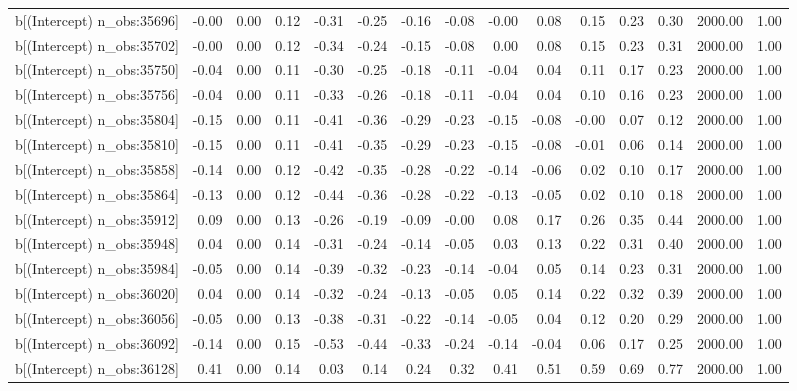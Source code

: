 \begin{table}[ht]
\begin{tabular}{rrrrrrrrrrrrrrr}
  b[(Intercept) n\_obs:35696] & -0.00 & 0.00 & 0.12 & -0.31 & -0.25 & -0.16 & -0.08 & -0.00 & 0.08 & 0.15 & 0.23 & 0.30 & 2000.00 & 1.00 \\ 
  b[(Intercept) n\_obs:35702] & -0.00 & 0.00 & 0.12 & -0.34 & -0.24 & -0.15 & -0.08 & 0.00 & 0.08 & 0.15 & 0.23 & 0.31 & 2000.00 & 1.00 \\ 
  b[(Intercept) n\_obs:35750] & -0.04 & 0.00 & 0.11 & -0.30 & -0.25 & -0.18 & -0.11 & -0.04 & 0.04 & 0.11 & 0.17 & 0.23 & 2000.00 & 1.00 \\ 
  b[(Intercept) n\_obs:35756] & -0.04 & 0.00 & 0.11 & -0.33 & -0.26 & -0.18 & -0.11 & -0.04 & 0.04 & 0.10 & 0.16 & 0.23 & 2000.00 & 1.00 \\ 
  b[(Intercept) n\_obs:35804] & -0.15 & 0.00 & 0.11 & -0.41 & -0.36 & -0.29 & -0.23 & -0.15 & -0.08 & -0.00 & 0.07 & 0.12 & 2000.00 & 1.00 \\ 
  b[(Intercept) n\_obs:35810] & -0.15 & 0.00 & 0.11 & -0.41 & -0.35 & -0.29 & -0.23 & -0.15 & -0.08 & -0.01 & 0.06 & 0.14 & 2000.00 & 1.00 \\ 
  b[(Intercept) n\_obs:35858] & -0.14 & 0.00 & 0.12 & -0.42 & -0.35 & -0.28 & -0.22 & -0.14 & -0.06 & 0.02 & 0.10 & 0.17 & 2000.00 & 1.00 \\ 
  b[(Intercept) n\_obs:35864] & -0.13 & 0.00 & 0.12 & -0.44 & -0.36 & -0.28 & -0.22 & -0.13 & -0.05 & 0.02 & 0.10 & 0.18 & 2000.00 & 1.00 \\ 
  b[(Intercept) n\_obs:35912] & 0.09 & 0.00 & 0.13 & -0.26 & -0.19 & -0.09 & -0.00 & 0.08 & 0.17 & 0.26 & 0.35 & 0.44 & 2000.00 & 1.00 \\ 
  b[(Intercept) n\_obs:35948] & 0.04 & 0.00 & 0.14 & -0.31 & -0.24 & -0.14 & -0.05 & 0.03 & 0.13 & 0.22 & 0.31 & 0.40 & 2000.00 & 1.00 \\ 
  b[(Intercept) n\_obs:35984] & -0.05 & 0.00 & 0.14 & -0.39 & -0.32 & -0.23 & -0.14 & -0.04 & 0.05 & 0.14 & 0.23 & 0.31 & 2000.00 & 1.00 \\ 
  b[(Intercept) n\_obs:36020] & 0.04 & 0.00 & 0.14 & -0.32 & -0.24 & -0.13 & -0.05 & 0.05 & 0.14 & 0.22 & 0.32 & 0.39 & 2000.00 & 1.00 \\ 
  b[(Intercept) n\_obs:36056] & -0.05 & 0.00 & 0.13 & -0.38 & -0.31 & -0.22 & -0.14 & -0.05 & 0.04 & 0.12 & 0.20 & 0.29 & 2000.00 & 1.00 \\ 
  b[(Intercept) n\_obs:36092] & -0.14 & 0.00 & 0.15 & -0.53 & -0.44 & -0.33 & -0.24 & -0.14 & -0.04 & 0.06 & 0.17 & 0.25 & 2000.00 & 1.00 \\ 
  b[(Intercept) n\_obs:36128] & 0.41 & 0.00 & 0.14 & 0.03 & 0.14 & 0.24 & 0.32 & 0.41 & 0.51 & 0.59 & 0.69 & 0.77 & 2000.00 & 1.00 \\ 

\end{tabular}
\end{table}
